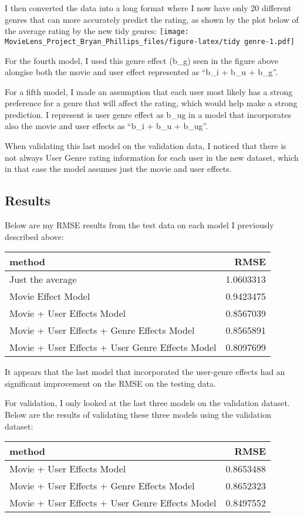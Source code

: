 \documentclass[]{article}
\begin{document}
I then converted the data into a long format where I now have only 20
different genres that can more accurately predict the rating, as shown
by the plot below of the average rating by the new tidy genres:
\texttt{[image: MovieLens\_Project\_Bryan\_Phillips\_files/figure-latex/tidy genre-1.pdf]}

For the fourth model, I used this genre effect (b\_g) seen in the figure
above alongise both the movie and user effect represented as ``b\_i +
b\_u + b\_g''.

For a fifth model, I made an assumption that each user most likely has a
strong preference for a genre that will affect the rating, which would
help make a strong prediction. I represent is user genre effect as b\_ug
in a model that incorporates also the movie and user effects as ``b\_i +
b\_u + b\_ug''.

When validating this last model on the validation data, I noticed that
there is not always User Genre rating information for each user in the
new dataset, which in that case the model assumes just the movie and
user effects.

\subsection{Results}\label{results}

Below are my RMSE results from the test data on each model I previously
described above:

\begin{longtable}[]{@{}lr@{}}
\toprule
method & RMSE\tabularnewline
\midrule
\endhead
Just the average & 1.0603313\tabularnewline
Movie Effect Model & 0.9423475\tabularnewline
Movie + User Effects Model & 0.8567039\tabularnewline
Movie + User Effects + Genre Effects Model & 0.8565891\tabularnewline
Movie + User Effects + User Genre Effects Model &
0.8097699\tabularnewline
\bottomrule
\end{longtable}

It appears that the last model that incorporated the user-genre effects
had an significant improvement on the RMSE on the testing data.

For validation, I only looked at the last three models on the validation
dataset. Below are the results of validating these three models using
the validation dataset:

\begin{longtable}[]{@{}lr@{}}
\toprule
method & RMSE\tabularnewline
\midrule
\endhead
Movie + User Effects Model & 0.8653488\tabularnewline
Movie + User Effects + Genre Effects Model & 0.8652323\tabularnewline
Movie + User Effects + User Genre Effects Model &
0.8497552\tabularnewline
\bottomrule
\end{longtable}
\end{document}
